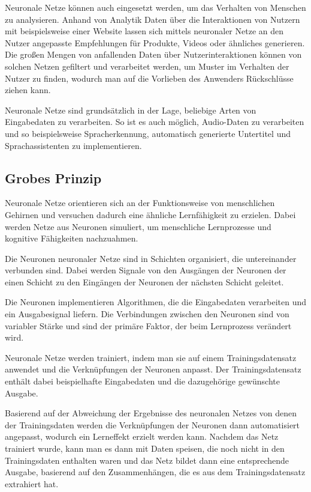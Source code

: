 Neuronale Netze können auch eingesetzt werden, um das Verhalten von Menschen zu analysieren. Anhand von Analytik Daten über die Interaktionen von Nutzern mit beispielsweise einer Website lassen sich mittels neuronaler Netze an den Nutzer angepasste Empfehlungen für Produkte, Videos oder ähnliches generieren.
Die großen Mengen von anfallenden Daten über Nutzerinteraktionen können von solchen Netzen gefiltert und verarbeitet werden, um Muster im Verhalten der Nutzer zu finden, wodurch man auf die Vorlieben des Anwenders Rückschlüsse ziehen kann.

Neuronale Netze sind grundsätzlich in der Lage, beliebige Arten von Eingabedaten zu verarbeiten.
So ist es auch möglich, Audio-Daten zu verarbeiten und so beispielsweise Spracherkennung, automatisch generierte Untertitel und Sprachassistenten zu implementieren.

\subsection{Grobes Prinzip}\label{subsec:einleitung_nn_grobes:prinzip}
Neuronale Netze orientieren sich an der Funktionsweise von menschlichen Gehirnen und versuchen dadurch eine ähnliche Lernfähigkeit zu erzielen.
Dabei werden Netze aus Neuronen simuliert, um menschliche Lernprozesse und kognitive Fähigkeiten nachzuahmen. 

Die Neuronen neuronaler Netze sind in Schichten organisiert, die untereinander verbunden sind.
Dabei werden Signale von den Ausgängen der Neuronen der einen Schicht zu den Eingängen der Neuronen der nächsten Schicht geleitet.

Die Neuronen implementieren Algorithmen, die die Eingabedaten verarbeiten und ein Ausgabesignal liefern.
Die Verbindungen zwischen den Neuronen sind von variabler Stärke und sind der primäre Faktor, der beim Lernprozess verändert wird.

Neuronale Netze werden trainiert, indem man sie auf einem Trainingsdatensatz anwendet und die Verknüpfungen der Neuronen anpasst.
Der Trainingsdatensatz enthält dabei beispielhafte Eingabedaten und die dazugehörige gewünschte Ausgabe.

Basierend auf der Abweichung der Ergebnisse des neuronalen Netzes von denen der Trainingsdaten werden die Verknüpfungen der Neuronen dann automatisiert angepasst, wodurch ein Lerneffekt erzielt werden kann.
Nachdem das Netz trainiert wurde, kann man es dann mit Daten speisen, die noch nicht in den Trainingsdaten enthalten waren und das Netz bildet dann eine entsprechende Ausgabe, basierend auf den Zusammenhängen, die es aus dem Trainingsdatensatz extrahiert hat.